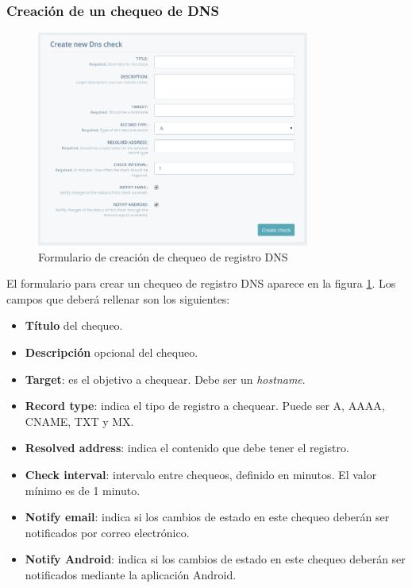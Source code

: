 \subsubsection{Creación de un chequeo de DNS}

\begin{figure}[hbtp]
  \centering
  \includegraphics[width=0.8\textwidth]{apendice_manual_usuario/pantalla_crear_dns.png}
  \caption{Formulario de creación de chequeo de registro DNS}
  \label{fig:crear-dns}
\end{figure}

El formulario para crear un chequeo de registro DNS aparece en la figura
\ref{fig:crear-dns}. Los campos que deberá rellenar son los siguientes:

\begin{itemize}
\item \textbf{Título} del chequeo.
\item \textbf{Descripción} opcional del chequeo.
\item \textbf{Target}: es el objetivo a chequear. Debe ser un \textit{hostname}.
\item \textbf{Record type}: indica el tipo de registro a chequear. Puede ser A, AAAA, CNAME, TXT y MX.
\item \textbf{Resolved address}: indica el contenido que debe tener el registro.
\item \textbf{Check interval}: intervalo entre chequeos, definido en minutos. El
  valor mínimo es de 1 minuto.
\item \textbf{Notify email}: indica si los cambios de estado en este chequeo
  deberán ser notificados por correo electrónico.
\item \textbf{Notify Android}: indica si los cambios de estado en este chequeo
  deberán ser notificados mediante la aplicación Android.
\end{itemize}

